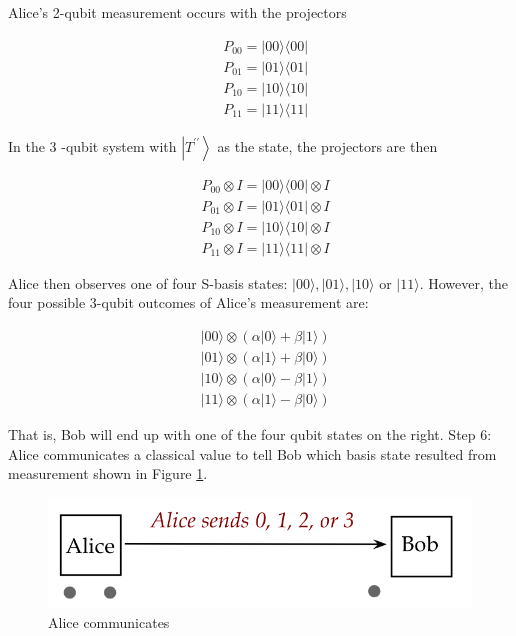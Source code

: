\documentclass[main.tex]{subfiles}
\begin{document}
    Alice's 2-qubit measurement occurs with the projectors
    
    $$
    \begin{aligned}
    &P_{00}=|00\rangle\langle 00| \\
    &P_{01}=|01\rangle\langle 01| \\
    &P_{10}=|10\rangle\langle 10| \\
    &P_{11}=|11\rangle\langle 11|
    \end{aligned}
    $$
    
    In the 3 -qubit system with $\left|T^{\prime \prime}\right\rangle$ as the state, the projectors are then
    
    $$
    \begin{aligned}
    &P_{00} \otimes I=|00\rangle\langle 00| \otimes I \\
    &P_{01} \otimes I=|01\rangle\langle 01| \otimes I \\
    &P_{10} \otimes I=|10\rangle\langle 10| \otimes I \\
    &P_{11} \otimes I=|11\rangle\langle 11| \otimes I
    \end{aligned}
    $$
    
    Alice then observes one of four S-basis states: $|00\rangle,|01\rangle,|10\rangle$ or $|11\rangle$. However, the four possible 3-qubit outcomes of Alice's measurement are:
    
    $$
    \begin{aligned}
    &|00\rangle \otimes(\alpha|0\rangle+\beta|1\rangle) \\
    &|01\rangle \otimes(\alpha|1\rangle+\beta|0\rangle) \\
    &|10\rangle \otimes(\alpha|0\rangle-\beta|1\rangle) \\
    &|11\rangle \otimes(\alpha|1\rangle-\beta|0\rangle)
    \end{aligned}
    $$
    
    That is, Bob will end up with one of the four qubit states on the right. Step 6: Alice communicates a classical value to tell Bob which basis state resulted from measurement shown in Figure \ref{fig:33teleport6}.
    
    \begin{figure}
        \centering
        \includegraphics[width=5in]{notes/figs/n07/33teleport6.png}
        \caption{Alice communicates}
        \label{fig:33teleport6}
    \end{figure}
    
\end{document}

